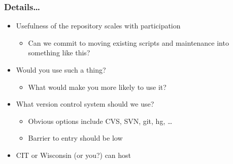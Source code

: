 \documentclass{beamer}
\begin{document}
\begin{frame}
\frametitle{Details\ldots{}}
\begin{itemize}
    \item Usefulness of the repository scales with participation
    \begin{itemize}
        \item Can we commit to moving existing scripts and maintenance into something like this?
    \end{itemize}
    \item Would you use such a thing?
    \begin{itemize}
        \item What would make you more likely to use it?
    \end{itemize}
    \item What version control system should we use?
    \begin{itemize}
        \item Obvious options include CVS, SVN, git, hg, \ldots{}
        \item Barrier to entry should be low
    \end{itemize}
    \item CIT or Wisconsin (or you?) can host
\end{itemize}
\end{frame}
\end{document}

